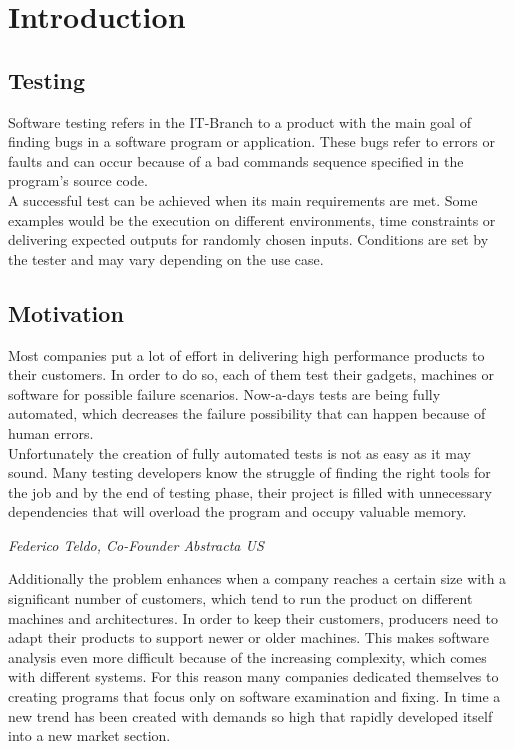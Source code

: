 %
\chapter{Introduction}
\section{Testing}
Software testing refers in the IT-Branch to a product with the main goal of finding bugs in a software program or application. These bugs refer to errors or faults and can occur because of a bad commands sequence specified in the program's source code.\\
A successful test can be achieved when its main requirements are met. Some examples would be the execution on different environments, time constraints or delivering expected outputs for randomly chosen inputs. Conditions are set by the tester and may vary depending on the use case.\\
\section{Motivation}
Most companies put a lot of effort in delivering high performance products to their customers. In order to do so, each of them test their gadgets, machines or software for possible failure scenarios. Now-a-days tests are being fully automated, which decreases the failure possibility that can happen because of human errors.\cite{8389562}\\ Unfortunately the creation of fully automated tests is not as easy as it may sound. Many testing developers know the struggle of finding the right tools for the job and by the end of testing phase, their project is filled with unnecessary dependencies that will overload the program and occupy valuable memory.
\begin{center}
	\begin{flushright}
		\textit{Federico Teldo, Co-Founder Abstracta US}
	\end{flushright}
\end{center}
Additionally the problem enhances when a company reaches a certain size with a significant number of customers, which tend to run the product on different machines and architectures. In order to keep their customers, producers need to adapt their products to support newer or older machines. This makes software analysis even more difficult because of the increasing complexity, which comes with different systems. For this reason many companies dedicated themselves to creating programs that focus only on software examination and fixing. In time a new trend has been created with demands so high that rapidly developed itself into a new market section.\\

